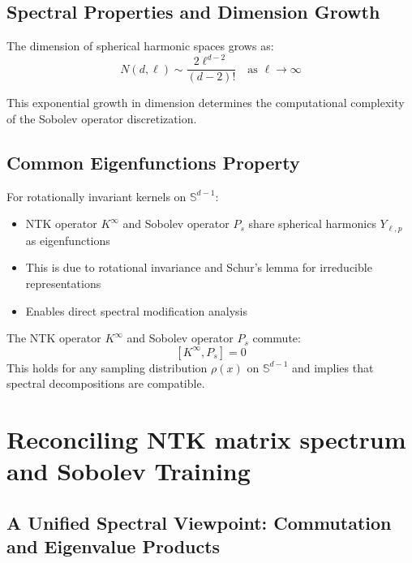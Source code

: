 \documentclass[a4paper]{article}
\begin{document}
\subsection{Spectral Properties and Dimension Growth}

The dimension of spherical harmonic spaces grows as:
\[ N(d,\ell) \sim \frac{2\ell^{d-2}}{(d-2)!} \quad \text{as } \ell \to \infty \]

This exponential growth in dimension determines the computational complexity of the Sobolev operator discretization.

\subsection{Common Eigenfunctions Property}

\begin{theorem}
For rotationally invariant kernels on $\mathbb{S}^{d-1}$:
\begin{itemize}
\item NTK operator $K^{\infty}$ and Sobolev operator $P_s$ share spherical harmonics $Y_{\ell,p}$ as eigenfunctions
\item This is due to rotational invariance and Schur's lemma for irreducible representations
\item Enables direct spectral modification analysis
\end{itemize}
\end{theorem}

\begin{theorem}
The NTK operator $K^{\infty}$ and Sobolev operator $P_s$ commute:
\[ [K^{\infty}, P_s] = 0 \]
This holds for any sampling distribution $\rho(x)$ on $\mathbb{S}^{d-1}$ and implies that spectral decompositions are compatible.
\end{theorem}





\section{Reconciling NTK matrix spectrum and Sobolev Training}

\subsection{A Unified Spectral Viewpoint: Commutation and Eigenvalue Products}
\end{document}
